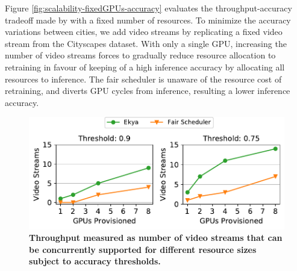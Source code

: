 Figure \ref{fig:scalability-fixedGPUs-accuracy} evaluates the throughput-accuracy tradeoff made by \name{} with a fixed number of resources. To minimize the accuracy variations between cities, we add video streams by replicating a fixed video stream from the Cityscapes dataset. 
With only a single GPU, increasing the number of video streams forces \name{} to gradually reduce resource allocation to retraining in favour of keeping of a high inference accuracy by allocating all resources to inference. The fair scheduler is unaware of the resource cost of retraining, and diverts GPU cycles from inference, resulting a lower inference accuracy.

\begin{figure}
 	\includegraphics[width=\linewidth]{results/scalability/scalability_GPUs_cams_cityscapes.pdf}
	\caption{\bf Throughput measured as number of video streams that can be concurrently supported for different resource sizes subject to accuracy thresholds.
	}
	\label{fig:scalability-gpu-vs-cam-thresholded}
\end{figure}

